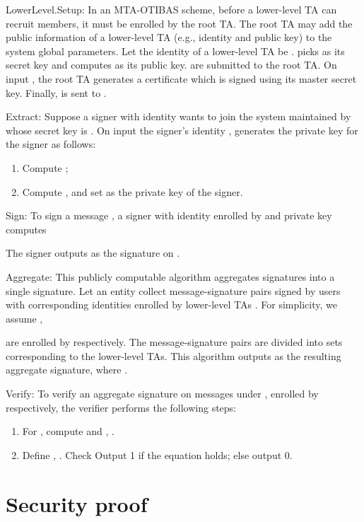 \documentclass[10pt,journal,compsoc]{IEEEtran}
\begin{document}
\smallskip
{\sf LowerLevel.Setup}: In an MTA-OTIBAS scheme, before a lower-level TA can recruit members, it must be
enrolled by the root TA. The root TA may add the public information
of a lower-level TA (e.g., identity and public key) to the system
global parameters. Let the identity of a lower-level TA
 be .  picks
 as its secret key and computes
 as its public key. 
are submitted to the root TA. On input ,
the root TA generates a certificate  which is
signed using its master secret key. Finally, 
is sent to .

\smallskip
{\sf Extract}: Suppose a signer with identity  wants to join
the system maintained by  whose secret key is
. On input the signer's identity , 
generates the private key for the signer as follows:
\begin{enumerate}
  \item Compute ;
  \item Compute , and set  as the private key of the signer.
\end{enumerate}

\smallskip
{\sf Sign}:
\smallskip
To sign a message , a signer with identity  enrolled by
 and private key 
computes

The signer outputs  as the signature on .

\smallskip
{\sf Aggregate}:
\smallskip
This publicly computable algorithm aggregates  signatures into a
single signature. Let an entity collect  message-signature pairs
 signed by  users
with corresponding identities  enrolled by
 lower-level TAs . For
simplicity, we assume ,

are enrolled by  respectively.
The message-signature pairs are divided into  sets corresponding
to the  lower-level TAs. This algorithm outputs  as the
resulting aggregate signature, where .


\smallskip
{\sf Verify}:
\smallskip
To verify an aggregate signature  on messages 
 under ,
 enrolled by
 respectively, the verifier
performs the following steps:
    \begin{enumerate}
      \item For , compute  and
      ,  .

      \item Define ,
. Check
 Output 1 if the equation holds; else output 0.
      \end{enumerate}

\section{Security proof}\label{correctness and
security}
\end{document}
